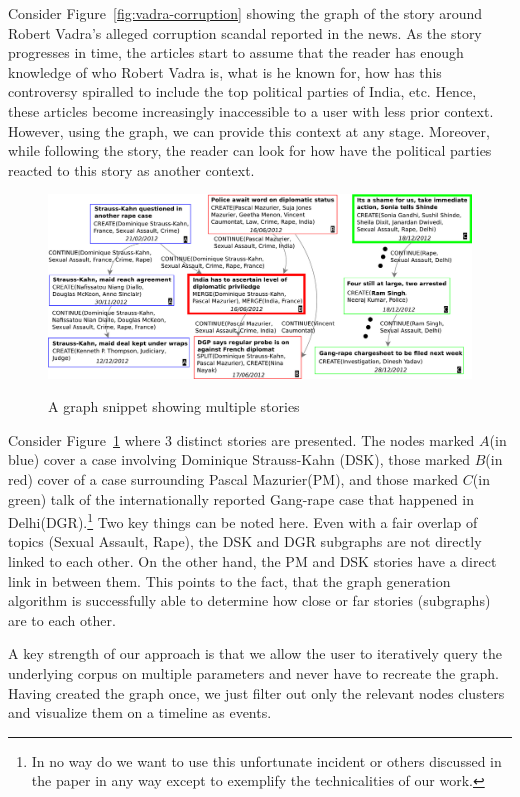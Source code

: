 Consider Figure~\ref{fig:vadra-corruption} showing the graph of the story around Robert Vadra's alleged
corruption scandal reported in the news. As the story progresses in time, the articles
start to assume that the reader has enough knowledge of who Robert Vadra is, what is he known for,
how has this controversy spiralled to include the top political parties of India, etc. Hence, these articles
become increasingly inaccessible to a user with less prior context. However, 
using the graph, we can provide this context at any stage. Moreover, while following the story, 
the reader can look for how have the political parties reacted to this story as another context.
\begin{figure}
\caption{A graph snippet showing multiple stories}
\includegraphics[scale=0.34]{figures/graph-2.pdf}
\label{fig:context-graph-example}
\end{figure}

 

Consider Figure~\ref{fig:context-graph-example} where 3 distinct stories are presented. The nodes marked $A$(in blue) cover a case involving Dominique Strauss-Kahn (DSK), 
those marked $B$(in red) cover of a case surrounding Pascal Mazurier(PM), and those marked $C$(in green) talk of the internationally reported Gang-rape case
that happened in Delhi(DGR).\footnote{In no way do we want to use this unfortunate incident or others discussed in the paper in any way except 
to exemplify the technicalities of our work.} Two key things can be noted here. Even with a fair overlap of topics (Sexual Assault, Rape), the DSK and DGR subgraphs are not directly linked to each other.
On the other hand, the PM and DSK stories have a direct link in between them. This points to the fact, that the graph generation algorithm is successfully able
to determine how close or far stories (subgraphs) are to each other.

A key strength of our approach is that we allow the user to iteratively query the underlying corpus on multiple parameters and never have to recreate
the graph. Having created the graph once, we just filter out only the relevant nodes clusters and visualize them on a timeline as events. 
